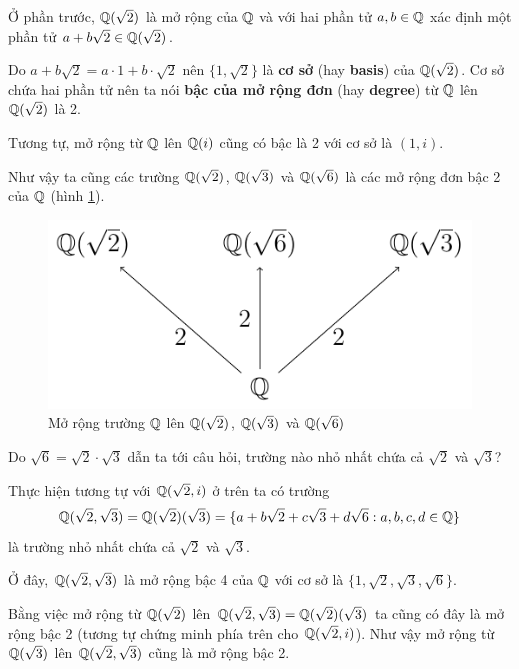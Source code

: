 Ở phần trước, $\mathbb{Q}(\sqrt{2})$ là mở rộng của $\mathbb{Q}$ và với hai phần tử $a, b \in \mathbb{Q}$ xác định một phần tử $a + b \sqrt{2} \in \mathbb{Q}(\sqrt{2})$.

Do $a + b \sqrt{2} = a \cdot 1 + b \cdot \sqrt{2}$ nên $\{ 1, \sqrt{2} \}$ là \textbf{cơ sở} (hay \textbf{basis}) của $\mathbb{Q}(\sqrt{2})$. Cơ sở chứa hai phần tử nên ta nói \textbf{bậc của mở rộng đơn} (hay \textbf{degree}) từ $\mathbb{Q}$ lên $\mathbb{Q}(\sqrt{2})$ là 2.

Tương tự, mở rộng từ $\mathbb{Q}$ lên $\mathbb{Q}(i)$ cũng có bậc là 2 với cơ sở là $(1, i)$.

Như vậy ta cũng các trường $\mathbb{Q}(\sqrt{2})$, $\mathbb{Q}(\sqrt{3})$ và $\mathbb{Q}(\sqrt{6})$ là các mở rộng đơn bậc 2 của $\mathbb{Q}$ (hình \ref{extension_field:1}).

\begin{figure}[htb]
    \centering
    \includegraphics[page=1]{figures/extension_field.pdf}
    \caption{Mở rộng trường $\mathbb{Q}$ lên $\mathbb{Q}(\sqrt{2})$, $\mathbb{Q}(\sqrt{3})$ và $\mathbb{Q}(\sqrt{6})$}
    \label{extension_field:1}
\end{figure}

Do $\sqrt{6} = \sqrt{2} \cdot \sqrt{3}$ dẫn ta tới câu hỏi, trường nào nhỏ nhất chứa cả $\sqrt{2}$ và $\sqrt{3}$?

Thực hiện tương tự với $\mathbb{Q}(\sqrt{2}, i)$ ở trên ta có trường
\begin{equation*}
    \mathbb{Q}(\sqrt{2}, \sqrt{3}) = \mathbb{Q}(\sqrt{2})(\sqrt{3}) = \{ a + b \sqrt{2} + c \sqrt{3} + d \sqrt{6} : a, b, c, d \in \mathbb{Q} \}
\end{equation*}
là trường nhỏ nhất chứa cả $\sqrt{2}$ và $\sqrt{3}$.

Ở đây, $\mathbb{Q}(\sqrt{2}, \sqrt{3})$ là mở rộng bậc 4 của $\mathbb{Q}$ với cơ sở là $\{ 1, \sqrt{2}, \sqrt{3}, \sqrt{6} \}$.

Bằng việc mở rộng từ $\mathbb{Q}(\sqrt{2})$ lên $\mathbb{Q}(\sqrt{2}, \sqrt{3}) = \mathbb{Q}(\sqrt{2})(\sqrt{3})$ ta cũng có đây là mở rộng bậc 2 (tương tự chứng minh phía trên cho $\mathbb{Q}(\sqrt{2}, i)$). Như vậy mở rộng từ $\mathbb{Q}(\sqrt{3})$ lên $\mathbb{Q}(\sqrt{2}, \sqrt{3})$ cũng là mở rộng bậc 2.

